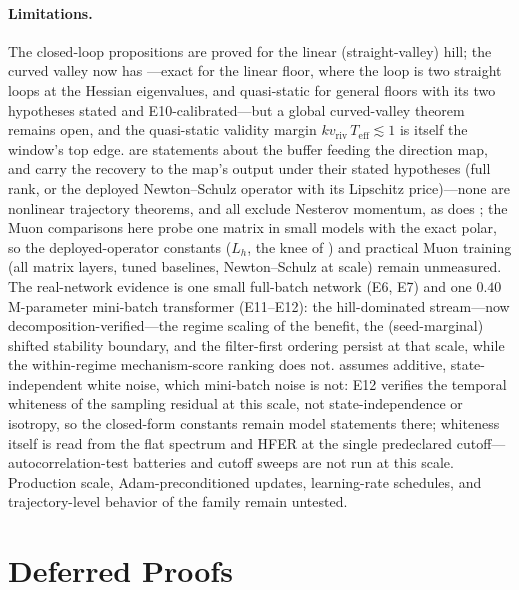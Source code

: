 \documentclass[11pt,a4paper]{article}
\theoremstyle{remark}
\newcommand{\Teff}{T_{\mathrm{eff}}}
\newcommand{\vriv}{v_{\mathrm{riv}}}
\begin{document}
\paragraph{Limitations.} The closed-loop propositions are proved for the linear (straight-valley) hill; the curved valley now has ---exact for the linear floor, where the loop is two straight loops at the Hessian eigenvalues, and quasi-static for general floors with its two hypotheses stated and E10-calibrated---but a global curved-valley theorem remains open, and the quasi-static validity margin $k\vriv\,\Teff\lesssim1$ is itself the window's top edge.
 are statements about the buffer feeding the direction map, and  carry the recovery to the map's output under their stated hypotheses (full rank, or the deployed Newton--Schulz operator with its Lipschitz price)---none are nonlinear trajectory theorems, and all exclude Nesterov momentum, as does \citet{li2026denoise}; the Muon comparisons here probe one matrix in small models with the exact polar, so the deployed-operator constants ($L_h$, the knee of ) and practical Muon training (all matrix layers, tuned baselines, Newton--Schulz at scale) remain unmeasured.
The real-network evidence is one small full-batch network (E6, E7) and one $0.40$M-parameter mini-batch transformer (E11--E12): the hill-dominated stream---now decomposition-verified---the regime scaling of the benefit, the (seed-marginal) shifted stability boundary, and the filter-first ordering persist at that scale, while the within-regime mechanism-score ranking does not.
 assumes additive, state-independent white noise, which mini-batch noise is not: E12 verifies the temporal whiteness of the sampling residual at this scale, not state-independence or isotropy, so the closed-form constants remain model statements there; whiteness itself is read from the flat spectrum and HFER at the single predeclared cutoff---autocorrelation-test batteries and cutoff sweeps are not run at this scale.
Production scale, Adam-preconditioned updates, learning-rate schedules, and trajectory-level behavior of the  family remain untested.

\appendix

\section{Deferred Proofs}
\label{app:proofs}
\end{document}
